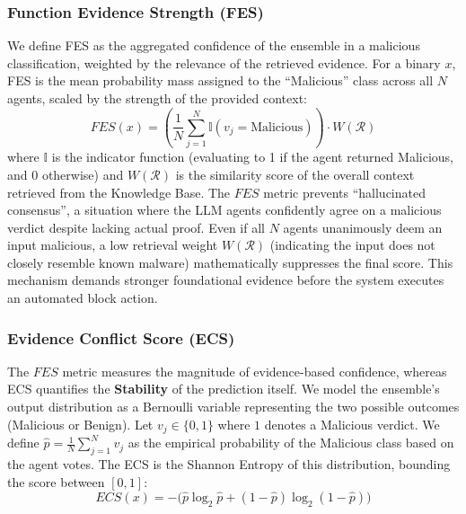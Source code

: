\documentclass[pdflatex,sn-mathphys-num]{sn-jnl}
\begin{document}
\subsubsection{Function Evidence Strength (FES)}
We define FES as the aggregated confidence of the ensemble in a malicious classification, weighted by the relevance of the retrieved evidence. For a binary $x$, FES is the mean probability mass assigned to the ``Malicious'' class across all $N$ agents, scaled by the strength of the provided context:
\begin{equation}
    FES(x) = \left( \frac{1}{N} \sum_{j=1}^{N} \mathbb{I}(v_j = \text{Malicious}) \right) \cdot W(\mathcal{R})
\end{equation}
where $\mathbb{I}$ is the indicator function (evaluating to 1 if the agent returned Malicious, and 0 otherwise) and $W(\mathcal{R})$ is the similarity score of the overall context retrieved from the Knowledge Base. The $FES$ metric prevents ``hallucinated consensus'', a situation where the LLM agents confidently agree on a malicious verdict despite lacking actual proof. Even if all $N$ agents unanimously deem an input malicious, a low retrieval weight $W(\mathcal{R})$ (indicating the input does not closely resemble known malware) mathematically suppresses the final score. This mechanism demands stronger foundational evidence before the system executes an automated block action.

\subsubsection{Evidence Conflict Score (ECS)}
The $FES$ metric measures the magnitude of evidence-based confidence, whereas ECS quantifies the \textbf{Stability} of the prediction itself. We model the ensemble's output distribution as a Bernoulli variable representing the two possible outcomes (Malicious or Benign). Let $v_j \in \{0, 1\}$ where $1$ denotes a Malicious verdict. We define $\hat{p} = \frac{1}{N}\sum_{j=1}^{N} v_j$ as the empirical probability of the Malicious class based on the agent votes. The ECS is the Shannon Entropy of this distribution, bounding the score between $[0, 1]$:
\begin{equation}
    ECS(x) = - \big( \hat{p} \log_2 \hat{p} + (1-\hat{p}) \log_2 (1-\hat{p}) \big)
\end{equation}
\end{document}
